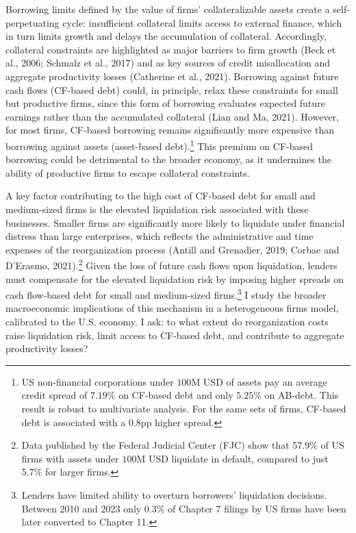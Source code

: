 \documentclass[12pt]{article}
\begin{document}
Borrowing limits defined by the value of firms' collateralizable assets create a self-perpetuating cycle: insufficient collateral limits access to external finance, which in turn limits growth and delays the accumulation of collateral. Accordingly, collateral constraints are highlighted as major barriers to firm growth (Beck et al., 2006; Schmalz et al., 2017) and as key sources of credit misallocation and aggregate productivity losses (Catherine et al., 2021). Borrowing against future cash flows (CF-based debt) could, in principle, relax these constraints for small but productive firms, since this form of borrowing evaluates expected future earnings rather than the accumulated collateral (Lian and  Ma, 2021). However, for most firms, CF-based borrowing remains significantly more expensive than borrowing against assets (asset-based debt).\footnote{US non-financial corporations under $100$M USD of assets pay an average credit spread of $7.19\%$ on CF-based debt and only $5.25\%$ on AB-debt. This result is robust to multivariate analysis. For the same sets of firms, CF-based debt is associated with a 0.8pp higher spread.} This premium on CF-based borrowing could be detrimental to the broader economy, as it undermines the ability of productive firms to escape collateral constraints.

A key factor contributing to the high cost of CF-based debt for small and medium-sized firms is the elevated liquidation risk associated with these businesses. Smaller firms are significantly more likely to liquidate under financial distress than large enterprises, which reflects the administrative and time expenses of the reorganization process (Antill and Grenadier, 2019; Corbae and D'Erasmo, 2021).\footnote{Data published by the Federal Judicial Center (FJC) show that 57.9\% of US firms with assets under $100$M USD liquidate in default, compared to just 5.7\% for larger firms.} Given the loss of future cash flows upon liquidation, lenders must compensate for the elevated liquidation risk by imposing higher spreads on cash flow-based debt for small and medium-sized firms.\footnote{Lenders have limited ability to overturn borrowers' liquidation decisions. Between 2010 and 2023 only 0.3\% of Chapter 7 filings by US firms have been later converted to Chapter 11.} I study the broader macroeconomic implications of this mechanism in a heterogeneous firms model, calibrated to the U.S. economy. I ask: to what extent do reorganization costs raise liquidation risk, limit access to CF-based debt, and contribute to aggregate productivity losses?
\end{document}
